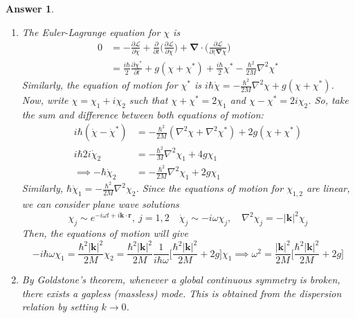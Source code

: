 \documentclass[a4paper]{article}
\newtheorem{ans}{Answer}[section]
\theoremstyle{new}
\begin{document}
\begin{ans}
\begin{enumerate}[label=(\alph*)]
unique up to total derivatives (like $0.5i\hbar(\psi_0^*\dot{\chi}-\psi_0\dot{\chi}^*)$) and constants.
\item The Euler-Lagrange equation for $\chi$ is
\begin{align}
0&=-\frac{\partial\mathcal{L}}{\partial\chi}+\frac{\partial}{\partial t}\bigg(\frac{\partial\mathcal{L}}{\partial\dot{\chi}}\bigg)+\boldsymbol{\nabla}\cdot\bigg(\frac{\partial\mathcal{L}}{\partial(\boldsymbol{\nabla}\chi}\bigg)\nonumber\\&=\frac{i\hbar}{2}\frac{\partial\chi^*}{\partial t}+g(\chi+\chi^*)+\frac{i\hbar}{2}\chi^*-\frac{\hbar^2}{2M}\nabla^2\chi^*\nonumber
\end{align}
Similarly, the equation of motion for $\chi^*$ is $i\hbar\dot{\chi}=-\frac{\hbar^2}{2M}\nabla^2\chi+g(\chi+\chi^*)$. Now, write $\chi=\chi_1+i\chi_2$ such that $\chi+\chi^*=2\chi_1$ and $\chi-\chi^*=2i\chi_2$. So, take the sum and difference between both equations of motion:
\begin{align}
    i\hbar(\dot{\chi}-\dot{\chi}^*)&=-\frac{\hbar^2}{2M}(\nabla^2\chi+\nabla^2\chi^*)+2g(\chi+\chi^*)\nonumber\\i\hbar 2i\dot{\chi}_2&=-\frac{\hbar^2}{M}\nabla^2\chi_1+4g\chi_1\nonumber\\\implies-\hbar\dot{\chi}_2&=-\frac{\hbar^2}{2M}\nabla^2\chi_1+2g\chi_1\nonumber
\end{align}
Similarly, $\hbar\dot{\chi}_1=-\frac{\hbar^2}{2M}\nabla^2\chi_2$. Since the equations of motion for $\chi_{1,2}$ are linear, we can consider plane wave solutions 
$$\chi_j\sim e^{-i\omega t+i\mathbf{k}\cdot\mathbf{r}},~j=1,2\quad\dot{\chi}_j\sim-i\omega\chi_j,\quad\nabla^2\chi_j=-|\mathbf{k}|^2\chi_j$$
Then, the equations of motion will give
$$-i\hbar\omega\chi_1=\frac{\hbar^2|\mathbf{k}|^2}{2M}\chi_2=\frac{\hbar^2|\mathbf{k}|^2}{2M}\frac{1}{i\hbar\omega}\bigg[\frac{\hbar^2|\mathbf{k}|^2}{2M}+2g\bigg]\chi_1\implies\omega^2=\frac{|\mathbf{k}|^2}{2M}\bigg[\frac{\hbar^2|\mathbf{k}|^2}{2M}+2g\bigg]$$
\item By Goldstone's theorem, whenever a global continuous symmetry is broken, there exists a gapless (massless) mode. This is obtained from the dispersion relation by setting $k\rightarrow 0$.
\end{enumerate}
\end{ans}
\newpage
\end{document}
